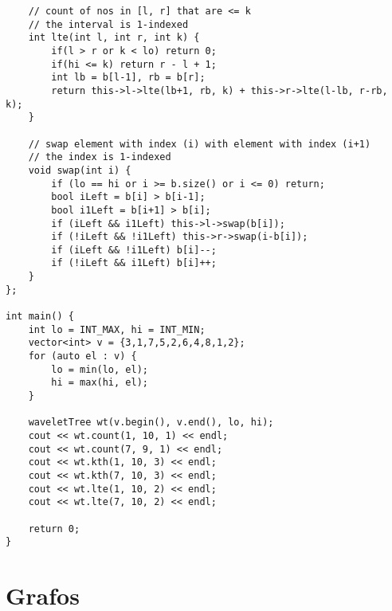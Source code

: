 \documentclass[landscape,twocolumn,10pt,a4paper]{article}
\begin{document}
\begin{verbatim}
    // count of nos in [l, r] that are <= k
    // the interval is 1-indexed
	int lte(int l, int r, int k) {
		if(l > r or k < lo) return 0;
		if(hi <= k) return r - l + 1;
		int lb = b[l-1], rb = b[r];
		return this->l->lte(lb+1, rb, k) + this->r->lte(l-lb, r-rb, k);
	}
    
    // swap element with index (i) with element with index (i+1)
    // the index is 1-indexed
    void swap(int i) {
        if (lo == hi or i >= b.size() or i <= 0) return;
        bool iLeft = b[i] > b[i-1];
        bool i1Left = b[i+1] > b[i];
        if (iLeft && i1Left) this->l->swap(b[i]);
        if (!iLeft && !i1Left) this->r->swap(i-b[i]);
        if (iLeft && !i1Left) b[i]--;
        if (!iLeft && i1Left) b[i]++;
    }
};

int main() {
    int lo = INT_MAX, hi = INT_MIN;
    vector<int> v = {3,1,7,5,2,6,4,8,1,2};
    for (auto el : v) {
        lo = min(lo, el);
        hi = max(hi, el);
    }

    waveletTree wt(v.begin(), v.end(), lo, hi);
    cout << wt.count(1, 10, 1) << endl;
    cout << wt.count(7, 9, 1) << endl;
    cout << wt.kth(1, 10, 3) << endl;
    cout << wt.kth(7, 10, 3) << endl;
    cout << wt.lte(1, 10, 2) << endl;
    cout << wt.lte(7, 10, 2) << endl;

    return 0;
}\end{verbatim}

\section{Grafos}
\end{document}
